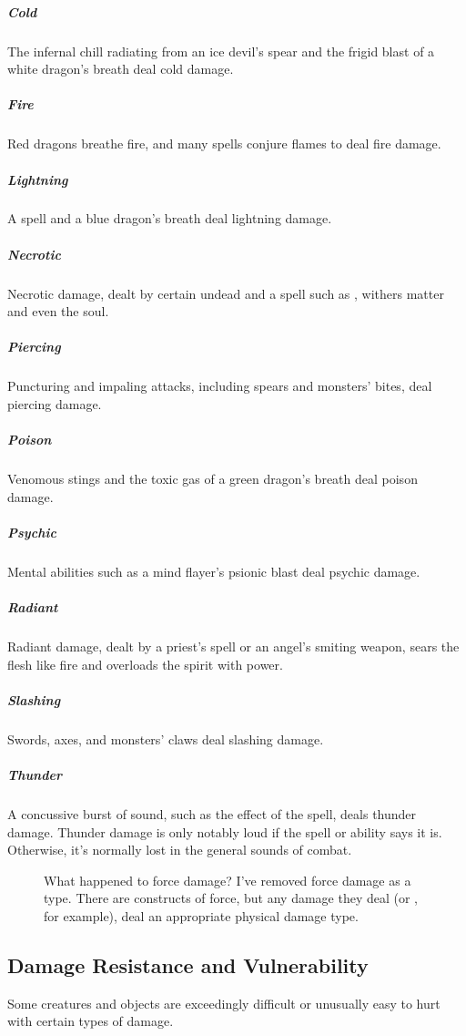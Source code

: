 \subparagraph*{Cold} The infernal chill radiating from an ice devil's spear and the frigid blast of a white dragon's breath deal cold damage.

\subparagraph*{Fire} Red dragons breathe fire, and many spells conjure flames to deal fire damage.

\subparagraph*{Lightning} A  spell and a blue dragon's breath deal lightning damage.

\subparagraph*{Necrotic} Necrotic damage, dealt by certain undead and a spell such as , withers matter and even the soul.

\subparagraph*{Piercing} Puncturing and impaling attacks, including spears and monsters' bites, deal piercing damage.

\subparagraph*{Poison} Venomous stings and the toxic gas of a green dragon's breath deal poison damage.

\subparagraph*{Psychic} Mental abilities such as a mind flayer's psionic blast deal psychic damage.

\subparagraph*{Radiant} Radiant damage, dealt by a priest's  spell or an angel's smiting weapon, sears the flesh like fire and overloads the spirit with power.

\subparagraph*{Slashing} Swords, axes, and monsters' claws deal slashing damage.

\subparagraph*{Thunder} A concussive burst of sound, such as the effect of the  spell, deals thunder damage. Thunder damage is only notably loud if the spell or ability says it is. Otherwise, it's normally lost in the general sounds of combat.

\begin{figure}[htb]
    \begin{DndComment}{What happened to force damage?}
        I've removed force damage as a type. There are constructs of force, but any damage they deal (or , for example), deal an appropriate physical damage type.
    \end{DndComment}
\end{figure}

\subsection{Damage Resistance and Vulnerability}

Some creatures and objects are exceedingly difficult or unusually easy to hurt with certain types of damage.

